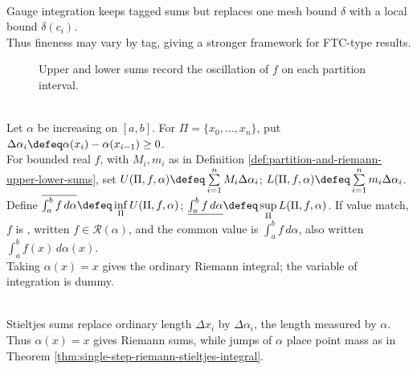 \begin{perspective} \label{per:gauge-integral-context} \\
Gauge integration keeps tagged sums but replaces one mesh bound $\delta$ with a local bound $\delta(c_i)$.\\
Thus fineness may vary by tag, giving a stronger framework for FTC-type results.
\end{perspective}

\begin{figure}[H]
  \centering
  
  \caption{Upper and lower sums record the oscillation of $f$ on each partition interval.}
  \label{fig:riemann-upper-lower-partition}
\end{figure}

\begin{definition} \label{def:riemann-stieltjes-integral} \\
Let $\alpha$ be increasing on $[a,b]$. For $\Pi=\{x_0,\ldots,x_n\}$, put $\Delta\alpha_i\defeq\alpha(x_i)-\alpha(x_{i-1})\geq0$.\\
For bounded real $f$, with $M_i,m_i$ as in Definition \ref{def:partition-and-riemann-upper-lower-sums}, set $U(\Pi,f,\alpha)\defeq\sum\limits_{i=1}^{n}M_i\Delta\alpha_i$; $L(\Pi,f,\alpha)\defeq\sum\limits_{i=1}^{n}m_i\Delta\alpha_i$.\\
Define $\overline{\int_a^b f\,d\alpha}\defeq\inf\limits_\Pi U(\Pi,f,\alpha)$; $\underline{\int_a^b f\,d\alpha}\defeq\sup\limits_\Pi L(\Pi,f,\alpha)$. If value match, $f$ is , written $f\in\mathcal{R}(\alpha)$, and the common value is $\int_a^b f\,d\alpha$, also written $\int_a^b f(x)\,d\alpha(x)$.\\
Taking $\alpha(x)=x$ gives the ordinary Riemann integral; the variable of integration is dummy.
\end{definition}

\begin{remark} \label{rem:stieltjes-increments-as-alpha-lengths} \\
Stieltjes sums replace ordinary length $\Delta x_i$ by $\Delta\alpha_i$, the length measured by $\alpha$.\\
Thus $\alpha(x)=x$ gives Riemann sums, while jumps of $\alpha$ place point mass as in Theorem \ref{thm:single-step-riemann-stieltjes-integral}.
\end{remark}

